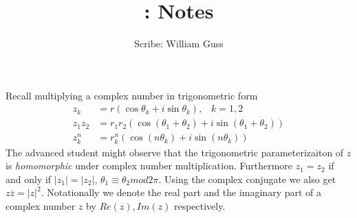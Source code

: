 \documentclass[letter]{article}
\title{\bCLASS: Notes }
\author{Scribe: William Guss}
\begin{document}
\maketitle
\thispagestyle{empty}

Recall multiplying a complex number in trigonometric form
	\begin{equation*}
		\begin{aligned}
		z_k &= r(\cos \theta_k + i \sin \theta_k),\;\;\;k=1,2 \\ 
		z_1z_2 &= r_1r_2(\cos(\theta_1 + \theta_2) + i\sin(\theta_1 + \theta_2))\\
		z_k^n &= r_k^n(\cos(n\theta_k) + i\sin(n\theta_k))
		\end{aligned}	
	\end{equation*}
	The advanced student might observe that the trigonometric parameterizaiton of $z$ is \emph{homomorphic} under complex number multiplication.
	Furthermore $z_1 = z_2$ if and only if $|z_1| = |z_2|$, $\theta_1 \equiv \theta_2 mod 2\pi$.
	Using the complex conjugate we also get $z \overline{z} = |z|^2$. 
	Notationally we denote the real part and the imaginary part of a complex number $z$ by $Re(z), Im(z)$ respectively.
\end{document}
